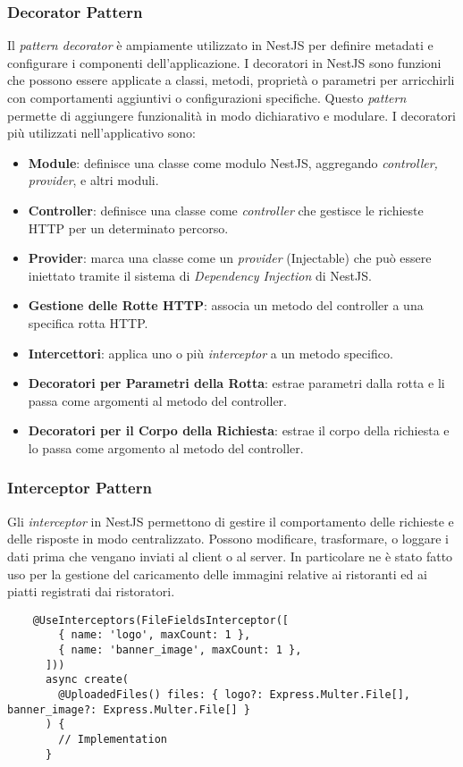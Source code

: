 \subsubsection{Decorator Pattern}
Il \textit{pattern decorator} è ampiamente utilizzato in NestJS per definire metadati e configurare i componenti dell'applicazione. 
I decoratori in NestJS sono funzioni che possono essere applicate a classi, metodi, proprietà o parametri per arricchirli con comportamenti aggiuntivi o configurazioni specifiche. 
Questo \textit{pattern} permette di aggiungere funzionalità in modo dichiarativo e modulare.
I decoratori più utilizzati nell'applicativo sono:
\begin{itemize}
	\item \textbf{Module}: definisce una classe come modulo NestJS, aggregando \textit{controller, provider}, e altri moduli.
	\item \textbf{Controller}: definisce una classe come \textit{controller} che gestisce le richieste HTTP per un determinato percorso.
	\item \textbf{Provider}: marca una classe come un \textit{provider} (Injectable) che può essere iniettato tramite il sistema di \textit{Dependency Injection} di NestJS.
	\item \textbf{Gestione delle Rotte HTTP}: associa un metodo del controller a una specifica rotta HTTP.
	\item \textbf{Intercettori}: applica uno o più \textit{interceptor} a un metodo specifico.
	\item \textbf{Decoratori per Parametri della Rotta}: estrae parametri dalla rotta e li passa come argomenti al metodo del controller.
	\item \textbf{Decoratori per il Corpo della Richiesta}: estrae il corpo della richiesta e lo passa come argomento al metodo del controller.
\end{itemize}


\subsubsection{Interceptor Pattern}
Gli \textit{interceptor} in NestJS permettono di gestire il comportamento delle richieste e delle risposte in modo centralizzato. 
Possono modificare, trasformare, o loggare i dati prima che vengano inviati al client o al server.
In particolare ne è stato fatto uso per la gestione del caricamento delle immagini relative ai ristoranti ed ai piatti registrati dai ristoratori.
\begin{lstlisting}
	@UseInterceptors(FileFieldsInterceptor([
		{ name: 'logo', maxCount: 1 },
		{ name: 'banner_image', maxCount: 1 },
	  ]))
	  async create(
		@UploadedFiles() files: { logo?: Express.Multer.File[], banner_image?: Express.Multer.File[] }
	  ) {
		// Implementation
	  }
\end{lstlisting}